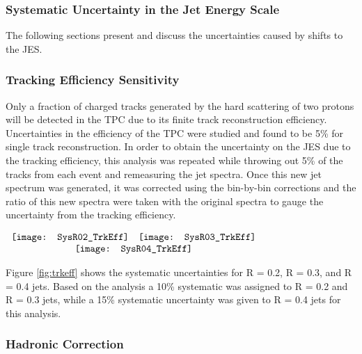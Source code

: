 \subsubsection{Systematic Uncertainty in the Jet Energy Scale}

The following sections present and discuss the uncertainties caused by shifts to the JES. 

\subsubsection{Tracking Efficiency Sensitivity}
Only a fraction of charged tracks generated by the hard scattering of two protons will be detected in the TPC due to its finite track reconstruction efficiency.  Uncertainties in the efficiency of the TPC were studied and found to be 5\% for single track reconstruction\cite{Abelev:2013ala}.  In order to obtain the uncertainty on the JES due to the tracking efficiency, this analysis was repeated while throwing out 5\% of the tracks from each event and remeasuring the jet spectra.  Once this new jet spectrum was generated, it was corrected using the bin-by-bin corrections and the ratio of this new spectra were taken with the original spectra to gauge the uncertainty from the tracking efficiency.


\begin{figure*}[t!]
$\begin{array}{rl}
    \texttt{[image: SysR02\_TrkEff]} &
    \texttt{[image: SysR03\_TrkEff]}\\
    \multicolumn{2}{c}{\texttt{[image: SysR04\_TrkEff]}}
\end{array}$
\caption[Systematic due to TPC tracking efficiency.]{\label{fig:trkeff}Systematic uncertainty due to TPC tracking efficiency; R = 0.2 \textit{(top left)}, R = 0.3 \textit{(top right)}, R = 0.4 \textit{(bottom)}.}
\end{figure*}


Figure \ref{fig:trkeff} shows the systematic uncertainties for R = 0.2, R = 0.3, and R = 0.4 jets.  Based on the analysis a 10\% systematic was assigned to R = 0.2 and R = 0.3 jets, while a 15\% systematic uncertainty was given to R = 0.4 jets for this analysis.

\subsubsection{Hadronic Correction}

